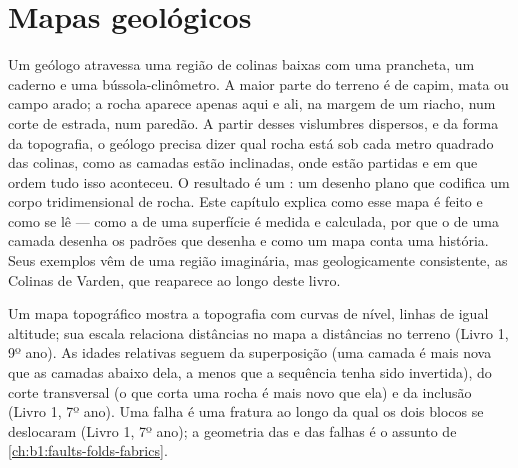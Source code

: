 \chapter{Mapas geológicos}\label{ch:b1:geological-maps}

Um geólogo atravessa uma região de colinas baixas com uma prancheta, um caderno e uma bússola-clinômetro. A maior parte do terreno é de capim, mata ou campo arado; a rocha aparece apenas aqui e ali, na margem de um riacho, num corte de estrada, num paredão. A partir desses vislumbres dispersos, e da forma da topografia, o geólogo precisa dizer qual rocha está sob cada metro quadrado das colinas, como as camadas estão inclinadas, onde estão partidas e em que ordem tudo isso aconteceu. O resultado é um : um desenho plano que codifica um corpo tridimensional de rocha. Este capítulo explica como esse mapa é feito e como se lê --- como a  de uma superfície é medida e calculada, por que o  de uma camada desenha os padrões que desenha e como um mapa conta uma história. Seus exemplos vêm de uma região imaginária, mas geologicamente consistente, as Colinas de Varden, que reaparece ao longo deste livro.

\begin{recall}
Um mapa topográfico mostra a topografia com curvas de nível, linhas de igual altitude; sua escala relaciona distâncias no mapa a distâncias no terreno (Livro 1, 9º ano). As idades relativas seguem da superposição (uma camada é mais nova que as camadas abaixo dela, a menos que a sequência tenha sido invertida), do corte transversal (o que corta uma rocha é mais novo que ela) e da inclusão (Livro 1, 7º ano). Uma falha é uma fratura ao longo da qual os dois blocos se deslocaram (Livro 1, 7º ano); a geometria das  e das falhas é o assunto de \cref{ch:b1:faults-folds-fabrics}.
\end{recall}

